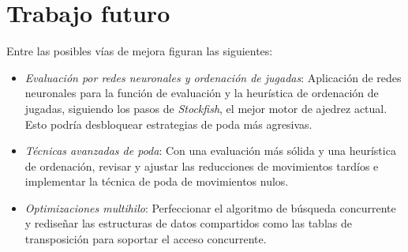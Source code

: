 \newpage
\section{Trabajo futuro}

\noindent Entre las posibles vías de mejora figuran las siguientes:

\begin{itemize}[itemsep=1pt]
    \item \textit{Evaluación por redes neuronales y ordenación de jugadas}:
    Aplicación de redes neuronales para la función de evaluación y la heurística de ordenación de jugadas, siguiendo los pasos de \textit{Stockfish}, el mejor motor de ajedrez actual. Esto podría desbloquear estrategias de poda más agresivas.
    \item \textit{Técnicas avanzadas de poda}:  
    Con una evaluación más sólida y una heurística de ordenación, revisar y ajustar las reducciones de movimientos tardíos e implementar la técnica de poda de movimientos nulos.
    \item \textit{Optimizaciones multihilo}:  
    Perfeccionar el algoritmo de búsqueda concurrente y rediseñar las estructuras de datos compartidos como las tablas de transposición para soportar el acceso concurrente.
\end{itemize}
